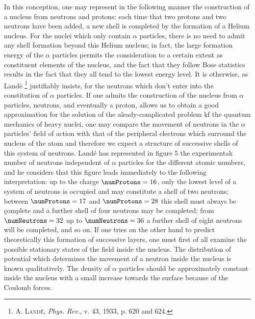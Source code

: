 \documentclass{article}
\begin{document}
In this conception, one may represent in the following manner the construction of a nucleus from neutrons and protons: each time that two protons and two neutrons have been added, a new shell is completed by the formation of a Helium nucleus. For the nuclei which only contain $\alpha$ particles, there is no need to admit any shell formation beyond this Helium nucleus; in fact, the large formation energy of the $\alpha$ particles permits the consideration to a certain extent as constituent elements of the nucleus, and the fact that they follow Bose statistics results in the fact that they all tend to the lowest energy level. It is otherwise, as Landé \footnote{\textsc{A. Landé}, \textit{Phys. Rev.}, v. 43, 1933, p. 620 and 624.} justifiably insists, for the neutrons which don't enter into the constitution of $\alpha$ particles. If one admits the construction of the nucleus from $\alpha$ particles, neutrons, and eventually a proton, allows us to obtain a good approximation for the solution of the aleady-complicated problem kf the quantum mechanics of heavy nuclei, one may compare the movement of neutrons in the $\alpha$ particles' field of action with that of the peripheral electrons which surround the nucleus of the atom and therefore we expect a structure of successive shells of this system of neutrons. Landé has represented in figure 5 the experimentak number of neutrons independent of $\alpha$ particles for the different atomic numbers, and he considers that this figure leads immediately to the following interpretation: up to the charge $\numProtons = 16$, only the lowest level of a system of neutrons is occupied and may constitute a shell of two neutrons; between $\numProtons = 17$ and $\numProtons = 28$ this shell must always be çomplete and a further shell of four neutrons may be completed; from $\numNeutrons = 32$ up to $\numNeutrons = 36$ a further shell of eight neutrons will be completed, and so on. If one tries on the other hand to predict theoretically this formation of successive layers, one must first of all examine the possible stationary states of the field inside the nucleus. The distribution of potential which determines the movement of a neutron inside the nucleus is known qualitatively. The density of $\alpha$ particles should be approximately constant inside the nucleus with a small increase towards the surface because of the Coulomb forces. 
\end{document}
